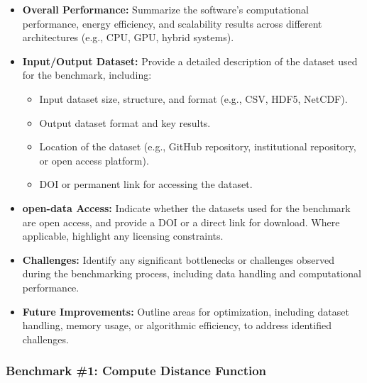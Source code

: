 \begin{itemize}
    \item \textbf{Overall Performance:} Summarize the software's computational performance, energy efficiency, and scalability results across different architectures (e.g., CPU, GPU, hybrid systems).
    \item \textbf{Input/Output Dataset:} Provide a detailed description of the dataset used for the benchmark, including:
        \begin{itemize}
            \item Input dataset size, structure, and format (e.g., CSV, HDF5, NetCDF).
            \item Output dataset format and key results.
            \item Location of the dataset (e.g., GitHub repository, institutional repository, or open access platform).
            \item DOI or permanent link for accessing the dataset.
        \end{itemize}
    \item \textbf{open-data Access:} Indicate whether the datasets used for the benchmark are open access, and provide a DOI or a direct link for download. Where applicable, highlight any licensing constraints.
    \item \textbf{Challenges:} Identify any significant bottlenecks or challenges observed during the benchmarking process, including data handling and computational performance.
    \item \textbf{Future Improvements:} Outline areas for optimization, including dataset handling, memory usage, or algorithmic efficiency, to address identified challenges.
\end{itemize}

%
%
%


\subsubsection{Benchmark \#1: Compute Distance Function}

